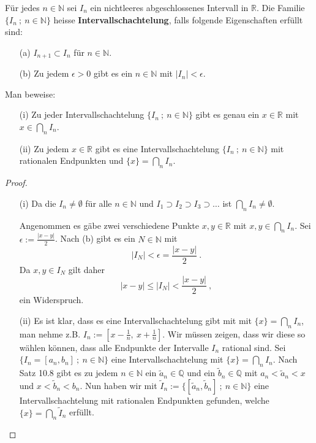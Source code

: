 \setcounter{aufgabe}{15}
\begin{aufgabe}
	Für jedes $n \in \mathbb N$ sei $I_n$ ein nichtleeres abgeschlossenes Intervall in 
	$\mathbb R$. Die Familie $\{ I_n \ ; \ n \in \mathbb N\}$ heisse
	\textbf{Intervallschachtelung}, falls folgende Eigenschaften erfüllt sind:
	\begin{enumerate}
		\item[(a)] $I_{n+1} \subset I_n$ für $n \in \mathbb N$.
		\item[(b)] Zu jedem $\epsilon > 0$ gibt es ein $n \in \mathbb N$ mit $|I_n| < \epsilon$.
	\end{enumerate}
	Man beweise:

	\begin{enumerate}
		\item[(i)] Zu jeder Intervallschachtelung $\{ I_n \ ; \ n \in \mathbb N \}$ gibt es genau
			ein $x \in \mathbb R$ mit $x \in \bigcap_n I_n$.
		\item[(ii)] Zu jedem $x \in \mathbb R$ gibt es eine Intervallschachtelung
			$\{I_n \ ; \ n \in \mathbb N\}$ mit rationalen Endpunkten und
			$\{x\} = \bigcap_n I_n$.
	\end{enumerate}
\end{aufgabe}
\begin{proof}
	\begin{enumerate}
	\item[(i)]
	Da die $I_n \neq \emptyset$ für alle $n \in \mathbb N$ und 
	$I_1 \supset I_2 \supset I_3 \supset \dots$ ist $\bigcap_n I_n \neq \emptyset$.

	Angenommen es gäbe zwei verschiedene Punkte $x, y \in \mathbb R$ mit 
	$x, y \in \bigcap_n I_n$. Sei $\epsilon := \frac{|x-y|}{2}$. Nach (b) gibt es
	ein $N \in \mathbb N$ mit 
	\[
		| I_N | < \epsilon = \frac{|x-y|}{2} \ .
	\]
	Da $x, y \in I_N$ gilt daher
	\[
		| x - y | \leq | I_N | < \frac{|x-y|}{2} \ ,
	\]
	ein Widerspruch.
	\item[(ii)] Es ist klar, dass es eine Intervallschachtelung gibt mit mit 
		$\{ x \} = \bigcap_n I_n$, man nehme z.B. $I_n := \left[ x-\frac 1 n, \ x + \frac 1 n \right]$.
		Wir müssen zeigen, dass wir diese so wählen können, dass alle Endpunkte der Intervalle
		$I_n$ rational sind. Sei $\{ I_n = [ a_n, b_n ] \ ; \ n \in \mathbb N \}$
		eine Intervallschachtelung mit $\{ x\} = \bigcap_n I_n$.
		Nach Satz 10.8 gibt es zu jedem $n \in \mathbb N$ ein $\tilde a_n \in \mathbb Q$ und ein 
		$\tilde b_n \in \mathbb Q$ mit $a_n < \tilde a_n < x$ und $x < \tilde b_n < b_n$.
		Nun haben wir mit $\tilde I_n := \{ [ \tilde a_n, \tilde b_n ] \ ; \ n \in \mathbb N\}$
		eine Intervallschachtelung mit rationalen Endpunkten gefunden, 
		welche $\{ x \} = \bigcap_n \tilde I_n$ erfüllt.
	\end{enumerate}
\end{proof}

